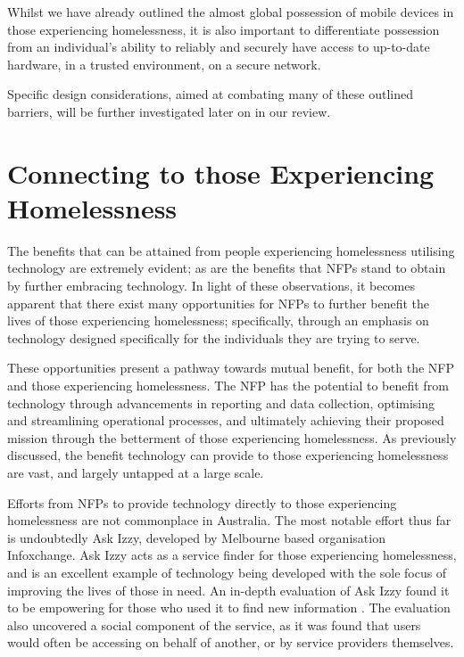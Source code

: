 Whilst we have already outlined the almost global possession of mobile devices in those experiencing homelessness, it is also important to differentiate possession from an individual's ability to reliably and securely have access to up-to-date hardware, in a trusted environment, on a secure network.

Specific design considerations, aimed at combating many of these outlined barriers, will be further investigated later on in our review.

\section{Connecting to those Experiencing Homelessness}

The benefits that can be attained from people experiencing homelessness utilising technology are extremely evident; as are the benefits that NFPs stand to obtain by further embracing technology. In light of these observations, it becomes apparent that there exist many opportunities for NFPs to further benefit the lives of those experiencing homelessness; specifically, through an emphasis on technology designed specifically for the individuals they are trying to serve.

These opportunities present a pathway towards mutual benefit, for both the NFP and those experiencing homelessness. The NFP has the potential to benefit from technology through advancements in reporting and data collection, optimising and streamlining operational processes, and ultimately achieving their proposed mission through the betterment of those experiencing homelessness. As previously discussed, the benefit technology can provide to those experiencing homelessness are vast, and largely untapped at a large scale.

Efforts from NFPs to provide technology directly to those experiencing homelessness are not commonplace in Australia. The most notable effort thus far is undoubtedly Ask Izzy, developed by Melbourne based organisation Infoxchange. Ask Izzy acts as a service finder for those experiencing homelessness, and is an excellent example of technology being developed with the sole focus of improving the lives of those in need. An in-depth evaluation of Ask Izzy found it to be empowering for those who used it to find new information \cite{burrows2019evaluating}. The evaluation also uncovered a social component of the service, as it was found that users would often be accessing on behalf of another, or by service providers themselves.

